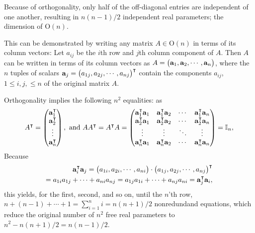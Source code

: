 
Because of orthogonality, only half of the off-diagonal entries are independent of one another,
resulting in $n(n-1)/2$ independent real parameters; the dimension of $ \textrm{O}(n)$.

{\color{OliveGreen}
\bproof
This can be demonstrated by writing any matrix $A \in \textrm{O}(n)$ in terms of its column vectors:
Let $a_{ij}$ be the $i$th row and $j$th column component of $A$.
Then $A$ can be written in terms of its column vectors as
$A=\begin{pmatrix}
{\bf a}_1,
{\bf a}_2,
\cdots ,
{\bf a}_n
\end{pmatrix}$,
where the $n$ tuples of scalars ${\bf a}_j = \begin{pmatrix}
{a}_{1j},
{a}_{2j},
\cdots ,
{a}_{nj}
\end{pmatrix}^\intercal $
contain the components $a_{ij}$, $ 1 \le i,j, \le n$ of the original matrix  $A$.

Orthogonality implies the following $n^2$ equalities: as
\begin{equation}
A^\intercal  =\begin{pmatrix}
{\bf a}_1^\intercal \\
{\bf a}_2^\intercal \\
\vdots \\
{\bf a}_n^\intercal
\end{pmatrix},
\text { and }
%
AA^\intercal =A^\intercal  A=
\begin{pmatrix}
{\bf a}_1^\intercal {\bf a}_1 & {\bf a}_1^\intercal {\bf a}_2  &\cdots & {\bf a}_1^\intercal {\bf a}_n  \\
{\bf a}_2^\intercal {\bf a}_1 & {\bf a}_2^\intercal {\bf a}_2  &\cdots & {\bf a}_2^\intercal {\bf a}_n  \\
\vdots   & \vdots &\ddots & \vdots  \\
{\bf a}_n^\intercal  {\bf a}_1& {\bf a}_n^\intercal {\bf a}_2  &\cdots & {\bf a}_n^\intercal {\bf a}_n  \\
\end{pmatrix}
={\Bbb I}_n,
\end{equation}
Because
\begin{equation}
\begin{split}
{\bf a}_i^\intercal {\bf a}_j =
\begin{pmatrix}
{a}_{1i},
{a}_{2i},
\cdots ,
{a}_{ni}
\end{pmatrix}
\cdot
\begin{pmatrix}
{a}_{1j},
{a}_{2j},
\cdots ,
{a}_{nj}
\end{pmatrix}^\intercal
\\
=
{a}_{1i}  {a}_{1j} +
\cdots +
{a}_{ni}  {a}_{nj}
=
{a}_{1j} {a}_{1i}  +
\cdots +
 {a}_{nj} {a}_{ni} =
{\bf a}_j^\intercal {\bf a}_i,
\end{split}
\end{equation}
this yields, for the first, second, and so on, until the $n$'th row,
$n + (n-1) +  \cdots +1= \sum_{i=1}^{n} i= n(n+1)/2$ nonredundand equations, which reduce the original number of $n^2$ free real parameters to
$n^2 - n(n+1)/2 = n(n-1)/2$.
\eproof
}

